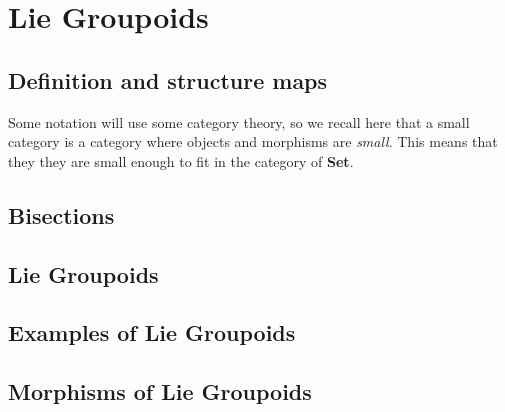 % 
\newpage
{}
\section{Lie Groupoids} %
\label{sec:lie_groupoids}
\subsection{Definition and structure maps} %
\label{sub:definition_and_structure_maps}
Some notation will use some category theory, so we recall here that a small category is a category where objects and morphisms are \textit{small}. This means that they they are small enough to fit in the category of \textbf{Set}.
\subsection{Bisections} %
\label{sub:bisections}

\subsection{Lie Groupoids} %
\label{sub:lie_groupoids}

\subsection{Examples of Lie Groupoids} %
\label{sub:examples_of_lie_groupoids}


\subsection{Morphisms of Lie Groupoids} %
\label{sub:morphisms_of_lie_groupoids}

